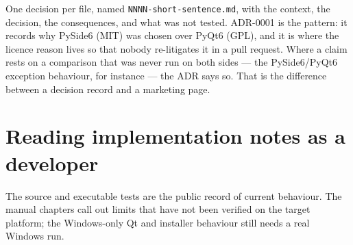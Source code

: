 One decision per file, named \texttt{NNNN-short-sentence.md}, with the context, the decision, the
consequences, and what was not tested. ADR-0001 is the pattern: it records why PySide6 (MIT) was
chosen over PyQt6 (GPL), and it is where the licence reason lives so that nobody re-litigates it in
a pull request. Where a claim rests on a comparison that was never run on both sides --- the
PySide6/PyQt6 exception behaviour, for instance --- the ADR says so. That is the difference between a
decision record and a marketing page.

\section{Reading implementation notes as a developer}

The source and executable tests are the public record of current behaviour. The manual chapters
call out limits that have not been verified on the target platform; the Windows-only Qt and
installer behaviour still needs a real Windows run.

